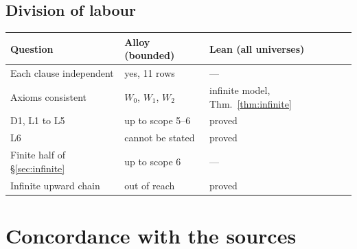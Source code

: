 \documentclass[11pt,a4paper]{article}
\theoremstyle{plain}
\theoremstyle{definition}
\theoremstyle{remark}
\begin{document}
\subsection{Division of labour}
\begin{center}
\small
\begin{tabular}{@{}lll@{}}
\toprule
Question & Alloy (bounded) & Lean (all universes) \\
\midrule
Each clause independent & yes, 11 rows & --- \\
Axioms consistent & $W_0$, $W_1$, $W_2$ & infinite model, Thm.~\ref{thm:infinite} \\
D1, L1 to L5 & up to scope 5--6 & proved \\
L6 & cannot be stated & proved \\
Finite half of \S\ref{sec:infinite} & up to scope 6 & --- \\
Infinite upward chain & out of reach & proved \\
\bottomrule
\end{tabular}
\end{center}

\appendix
\section{Concordance with the sources}
\end{document}
